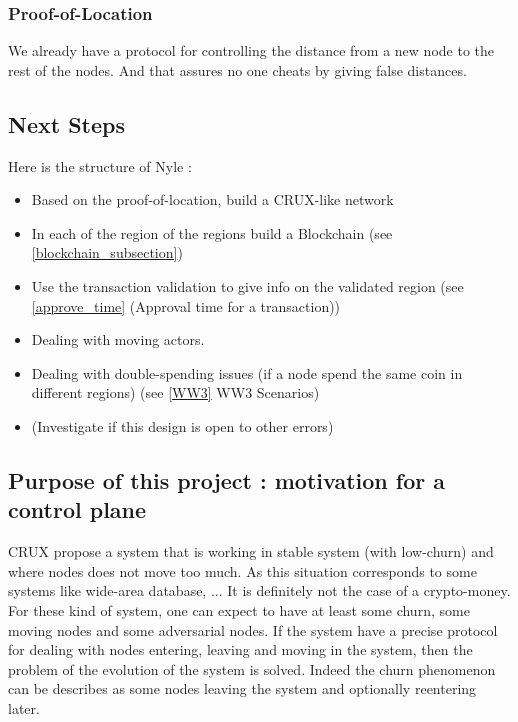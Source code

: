 \documentclass[a4paper,11pt,oneside]{report}
\begin{document}
\subsubsection{Proof-of-Location} We already have a protocol for controlling
the distance from a new node to the rest of the nodes. And that assures no one
cheats by giving false distances. 


\subsection{Next Steps} Here is the structure of Nyle :

\begin{itemize} 
\item Based on the proof-of-location, build a CRUX-like network
\item In each of the region of the regions build a Blockchain 
(see \ref{blockchain_subsection})
\item Use the transaction validation to  give info on the validated region
(see \ref{approve_time} (Approval time for a transaction))
\item Dealing with moving actors.
\item Dealing with double-spending issues
(if a node spend the same coin in different regions) 
(see \ref{WW3} WW3 Scenarios) 
\item (Investigate if this design is open to other errors)
\end{itemize}

\subsection{Purpose of this project : motivation for a control plane} CRUX
propose a system that is working in stable system (with low-churn) and where
nodes does not move too much. As this situation corresponds to some systems
like wide-area database, ... It is definitely not the case of a crypto-money.
For these kind of system, one can expect to have at least some churn, some
moving nodes and some adversarial nodes.  If the system have a precise protocol
for dealing with nodes entering, leaving and moving in the system, then the
problem of the evolution of the system is solved. Indeed the churn phenomenon
can be describes as some nodes leaving the system and optionally reentering
later. 
\end{document}

